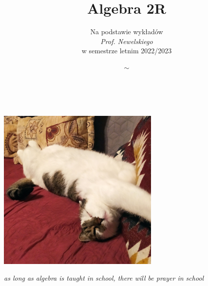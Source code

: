 \documentclass{article}
\title{Algebra 2R
}
\author{
  \footnotesize
  Na podstawie wykładów\medskip\\
  \emph{\normalsize Prof. Newelskiego}\medskip \\\footnotesize%
  w semestrze letnim 2022/2023
}
\date{$\sim$}
\begin{document}
\maketitle
\thispagestyle{empty}
\bigskip

$ $\bigskip\newline

\begin{center}
\includegraphics[width=0.6\textwidth]{./kytel.jpg}

{\slshape\scriptsize as long as algebra is taught in school, there will be prayer in school}
\end{center}

\newpage
\pagestyle{fancy}
\fancyhead{} %
\fancyfoot{} %
\fancyfoot[C]{\thepage}






\end{document}
